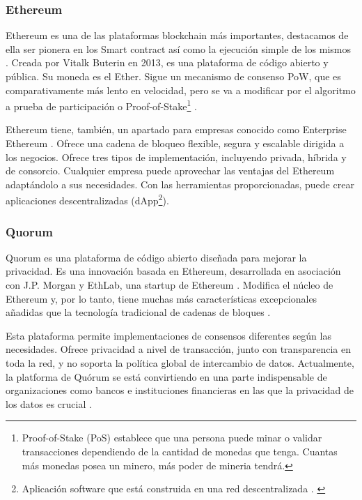 \subsubsection*{Ethereum}

Ethereum es una de las plataformas blockchain más importantes, destacamos de ella ser pionera en los Smart contract así 
como la ejecución simple de los mismos \cite{top-blockchain-platforms-app}. Creada por Vitalk Buterin en 2013, es una 
plataforma de código abierto y pública. Su moneda es el Ether. Sigue un mecanismo de consenso PoW, que es 
comparativamente más lento en velocidad, pero se va a modificar por el algoritmo a prueba de participación o 
Proof-of-Stake\footnote{Proof-of-Stake (PoS) establece que una persona puede minar o validar transacciones dependiendo 
de la cantidad de monedas que tenga. Cuantas más monedas posea un minero, más poder de mineria tendrá.\label{fnlabel}} 
\cite{proof-of-stake}.

\vspace{5mm}

\noindent Ethereum tiene, también, un apartado para empresas conocido como Enterprise Ethereum 
\cite{top-blockchain-platforms}. Ofrece una cadena de bloqueo flexible, segura y escalable dirigida a los negocios. 
Ofrece tres tipos de implementación, incluyendo privada, híbrida y de consorcio. Cualquier empresa puede aprovechar 
las ventajas del Ethereum adaptándolo a sus necesidades. Con las herramientas proporcionadas, puede crear aplicaciones 
descentralizadas (dApp\footnote{Aplicación software que está construida en una red descentralizada \cite{what-is-dapp}.
\label{fnlabel}}). 

\subsubsection*{Quorum}

Quorum es una plataforma de código abierto diseñada para mejorar la privacidad. Es una innovación basada en Ethereum, 
desarrollada en asociación con J.P. Morgan y EthLab, una startup de Ethereum . Modifica el núcleo de Ethereum y, por lo 
tanto, tiene muchas más características excepcionales añadidas que la tecnología tradicional de cadenas de bloques 
\cite{top-blockchain-platforms-app}. 

\vspace{5mm}

\noindent Esta plataforma permite implementaciones de consensos diferentes según las necesidades. Ofrece privacidad a 
nivel de transacción, junto con transparencia en toda la red, y no soporta la política global de intercambio de datos. 
Actualmente, la platforma de Quórum se está convirtiendo en una parte indispensable de organizaciones como bancos e 
instituciones financieras en las que la privacidad de los datos es crucial \cite{top-blockchain-platforms-app}.

